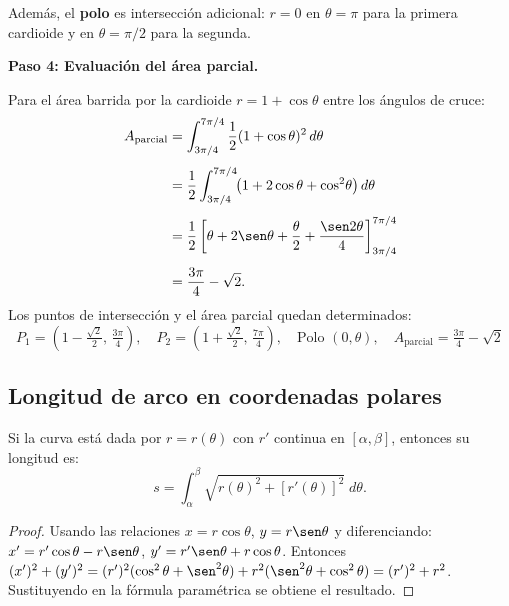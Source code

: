 \begin{example}
\begin{myproof}
Además, el \textbf{polo} es intersección adicional: $r = 0$ en
$\theta = \pi$ para la primera cardioide y en $\theta = \pi/2$ para la
segunda.

\textbf{Paso 4: Evaluación del área parcial.}

Para el área barrida por la cardioide $r = 1 + \cos\theta$ entre los
ángulos de cruce:
\begin{align*}
  A_{\text{parcial}}
  &= \int_{3\pi/4}^{7\pi/4}
     \frac{1}{2}(1 + \cos\theta)^2\,d\theta \\[4pt]
  &= \frac{1}{2}\int_{3\pi/4}^{7\pi/4}
     \!\bigl(1 + 2\cos\theta + \cos^2\!\theta\bigr)\,d\theta \\[4pt]
  &= \frac{1}{2}
     \left[\theta + 2\sen\theta
           + \frac{\theta}{2} + \frac{\sen 2\theta}{4}
     \right]_{3\pi/4}^{7\pi/4} \\[4pt]
  &= \frac{3\pi}{4} - \sqrt{2}.
\end{align*}
Los puntos de intersección y el área parcial quedan determinados:
\[
  \boxed{P_1 = \!\left(1-\tfrac{\sqrt{2}}{2},\,\tfrac{3\pi}{4}\right),
  \quad
  P_2 = \!\left(1+\tfrac{\sqrt{2}}{2},\,\tfrac{7\pi}{4}\right),
  \quad \text{Polo } (0,\theta),
  \quad A_{\text{parcial}} = \tfrac{3\pi}{4} - \sqrt{2}}
\]
\end{myproof}
\end{example}

\subsection{Longitud de arco en coordenadas polares}

\begin{theorem}
Si la curva está dada por $r = r(\theta)$ con $r'$ continua en
$[\alpha, \beta]$, entonces su longitud es:
\[
  s = \int_{\alpha}^{\beta}
      \sqrt{r(\theta)^2 + [r'(\theta)]^2}\;d\theta.
\]
\begin{proof}
Usando las relaciones $x = r\cos\theta$, $y = r\sen\theta$ y diferenciando:
$x' = r'\cos\theta - r\sen\theta$, $y' = r'\sen\theta + r\cos\theta$.
Entonces
$(x')^2 + (y')^2 = (r')^2(\cos^2\theta + \sen^2\theta)
 + r^2(\sen^2\theta + \cos^2\theta) = (r')^2 + r^2$.
Sustituyendo en la fórmula paramétrica se obtiene el resultado.
\end{proof}
\end{theorem}

